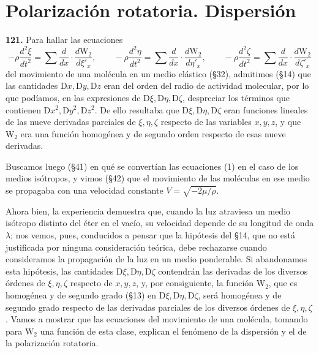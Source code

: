 \chapter{Polarización rotatoria. Dispersión}
\label{cap:polarizacion-dispersion}

\noindent\textbf{121.} Para hallar las ecuaciones
\begin{equation}
-\rho\frac{d^2\xi}{dt^2}=\sum\frac{d}{dx}\cdot\frac{d\mathrm{W}_2}{d\xi'_x},\qquad
-\rho\frac{d^2\eta}{dt^2}=\sum\frac{d}{dx}\cdot\frac{d\mathrm{W}_2}{d\eta'_x},\qquad
-\rho\frac{d^2\zeta}{dt^2}=\sum\frac{d}{dx}\cdot\frac{d\mathrm{W}_2}{d\zeta'_x}
\tag{1}
\end{equation}
del movimiento de una molécula en un medio elástico (§32), admitimos (§14)
que las cantidades $\mathrm{D}x,\mathrm{D}y,\mathrm{D}z$ eran del orden del radio de actividad
molecular, por lo que podíamos, en las expresiones de $\mathrm{D}\xi,\mathrm{D}\eta,\mathrm{D}\zeta$,
despreciar los términos que contienen $\mathrm{D}x^2,\mathrm{D}y^2,\mathrm{D}z^2$. De ello resultaba
que $\mathrm{D}\xi,\mathrm{D}\eta,\mathrm{D}\zeta$ eran funciones lineales de las nueve derivadas
parciales de $\xi,\eta,\zeta$ respecto de las variables $x,y,z$, y que
$\mathrm{W}_2$ era una función homogénea y de segundo orden respecto de esas nueve
derivadas.

Buscamos luego (§41) en qué se convertían las ecuaciones (1) en el caso de
los medios isótropos, y vimos (§42) que el movimiento de las moléculas en
ese medio se propagaba con una velocidad constante
$V=\sqrt{-2\mu/\rho}$.

Ahora bien, la experiencia demuestra que, cuando la luz atraviesa un medio
isótropo distinto del éter en el vacío, su velocidad depende de su longitud
de onda $\lambda$; nos vemos, pues, conducidos a pensar que la hipótesis
del §14, que no está justificada por ninguna consideración teórica, debe
rechazarse cuando consideramos la propagación de la luz en un medio
ponderable. Si abandonamos esta hipótesis, las cantidades $\mathrm{D}\xi,\mathrm{D}\eta,\mathrm{D}\zeta$
contendrán las derivadas de los diversos órdenes de $\xi,\eta,\zeta$
respecto de $x,y,z$, y, por consiguiente, la función $\mathrm{W}_2$, que es
homogénea y de segundo grado (§13) en $\mathrm{D}\xi,\mathrm{D}\eta,\mathrm{D}\zeta$, será homogénea y
de segundo grado respecto de las derivadas parciales de los diversos
órdenes de $\xi,\eta,\zeta$. Vamos a mostrar que las ecuaciones del
movimiento de una molécula, tomando para $\mathrm{W}_2$ una función de esta clase,
explican el fenómeno de la dispersión y el de la polarización rotatoria.


